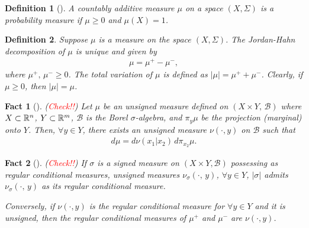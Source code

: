 \documentclass[dvipsnames]{article}
\newtheorem{fact}{Fact}
\newtheorem{definition}{Definition}
\providecommand{\R}{\ensuremath \mathbb{R}}
\begin{document}
\centering{\rule{.5\columnwidth}{1pt}}
\begin{definition}[{\cite[Definition 1.3.4]{bogachev_v1}}]
  A countably additive measure $\mu$ on a space $(X,\Sigma)$ is a probability measure if $\mu\ge 0$ and $\mu(X)=1$.
\end{definition}
\begin{definition}
  Suppose $\mu$ is a measure on the space $(X,\Sigma)$. The Jordan-Hahn decomposition of $\mu$ is unique and given by 
  \begin{align*}
    \mu=\mu^+-\mu^-,
  \end{align*}
  where $\mu^+,\,\mu^-\ge 0$. The total variation of $\mu$ is defined as $|\mu|=\mu^++\mu^-$. Clearly, if $\mu\ge 0$, then $|\mu|=\mu$.
\end{definition}
\begin{fact}[{\cite[Theorem 10.4.14]{bogachev_v2}}](\textcolor{red}{Check!!})
  Let $\mu$ be an unsigned measure defined on $(X\times Y,\,\mathcal B)$ where $X\subset \R^n$, $Y\subset \R^m$, $\mathcal B$ is the Borel $\sigma$-algebra, and $\pi_{y}\mu$ be the projection (marginal) onto $Y$. Then, $\forall y\in Y$, there exists an unsigned measure $\nu(\cdot,y)$ on $\mathcal B$ such that
  \begin{align*}
    d\mu=d\nu(x_1|x_2)\,d\pi_{x_2}\mu.
  \end{align*}
\label{fact:unsigned_conditional}
\end{fact}
\begin{fact}[{\cite[Remark 10.4.4]{bogachev_v2}}](\textcolor{red}{Check!!})
  If $\sigma$ is a signed measure on $(X\times Y, \mathcal B)$ possessing as regular conditional measures, unsigned measures $\nu_\sigma(\cdot,\,y)$, $\forall y\in Y$, $|\sigma|$ admits $\nu_\sigma(\cdot,\,y)$ as its regular conditional measure.
  \par
  Conversely, if $\nu(\cdot,y)$ is the regular conditional measure for $\forall y\in Y$ and it is unsigned, then the regular conditional measures of $\mu^+$ and $\mu^-$ are $\nu(\cdot,y)$.
\label{fact:variation}
\end{fact}
\end{document}

